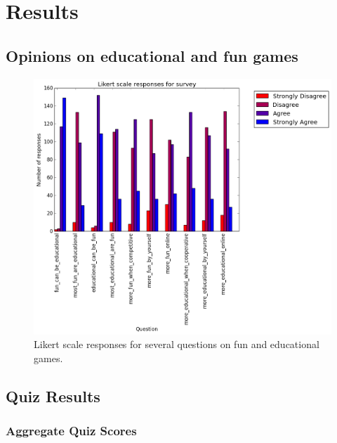 \chapter{Results}

	\section{Opinions on educational and fun games}
		\begin{figure}[] 
		\centering 
		\includegraphics[width=\textwidth]{survey_likert.png} 
		\caption{Likert scale responses for several questions on fun and educational games.}
		\end{figure}

	\section{Quiz Results}

		\subsection{Aggregate Quiz Scores}

